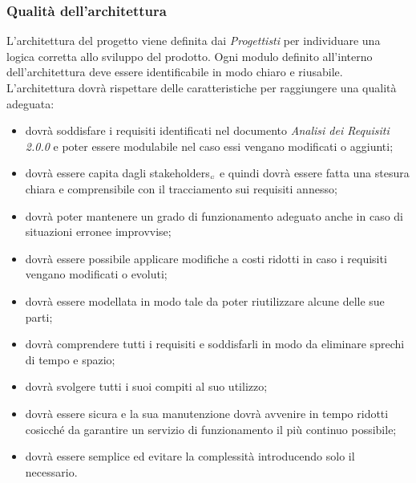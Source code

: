 \subsubsection{Qualità dell'architettura}\label{ProcessiPrimariProgettazioneQualitaArchitettura}
L'architettura del progetto viene definita dai \textit{Progettisti} per individuare una logica corretta allo sviluppo del prodotto. Ogni modulo definito all'interno dell'architettura deve essere identificabile in modo chiaro e riusabile.
L'architettura dovrà rispettare delle caratteristiche per raggiungere una qualità adeguata:
\begin{itemize}
	\item dovrà soddisfare i requisiti identificati nel documento \textit{Analisi dei Requisiti 2.0.0} e poter essere modulabile nel caso essi vengano modificati o aggiunti;
	\item dovrà essere capita dagli stakeholders$_{\scaleto{G}{3pt}}$ e quindi dovrà essere fatta una stesura chiara e comprensibile con il tracciamento sui requisiti annesso;
	\item dovrà poter mantenere un grado di funzionamento adeguato anche in caso di situazioni erronee improvvise;
	\item dovrà essere possibile applicare modifiche a costi ridotti in caso i requisiti vengano modificati o evoluti;
	\item dovrà essere modellata in modo tale da poter riutilizzare alcune delle sue parti;
	\item dovrà comprendere tutti i requisiti e soddisfarli in modo da eliminare sprechi di tempo e spazio;
	\item dovrà svolgere tutti i suoi compiti al suo utilizzo;
	\item dovrà essere sicura e la sua manutenzione dovrà avvenire in tempo ridotti cosicché da garantire un servizio di funzionamento il più continuo possibile;
	\item dovrà essere semplice ed evitare la complessità introducendo solo il necessario. %
\end{itemize} 

